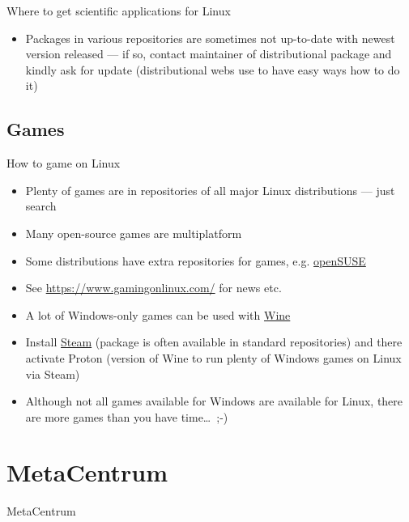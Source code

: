 \documentclass[compress, xelatex, 11pt, xcolor=svgnames, aspectratio=169,
	hyperref={
		bookmarks=true,
		unicode=true,
		colorlinks=true,
		pdftitle={Linux, command line and MetaCentrum},
		plainpages=false,
		pdfauthor={Vojtech Zeisek},
		pdfsubject={Course about use of Linux command line, writing shell scripts and using MetaCentrum of CESNET},
		pdfcreator={XeLaTeX},
		pdfkeywords={Linux, GNU, BASH, shell, command line, MetaCentrum},
		linkcolor=DarkRed, %
		anchorcolor=DarkBlue, %
		citecolor=Indigo, %
		filecolor=NavyBlue, %
		menucolor=DarkMagenta, %
		urlcolor=DarkBlue, %
		},
	url={hyphens, lowtilde} %
	]{beamer}
\begin{document}
\begin{frame}[allowframebreaks]{Where to get scientific applications for Linux}
\begin{itemize}
		\begin{itemize}
			\item Distributions sometimes provide packages at least for part of the packages of such languages --- typically at least for Python, Perl or R --- this is especially convenient for packages having plenty of complex dependencies
		\end{itemize}
		\item Packages in various repositories are sometimes not up-to-date with newest version released --- if so, contact maintainer of distributional package and kindly ask for update (distributional webs use to have easy ways how to do it)
	\end{itemize}
\end{frame}

\subsection{Games}

\begin{frame}{How to game on Linux}
	\begin{itemize}
		\item Plenty of games are in repositories of all major Linux distributions --- just search
		\item Many open-source games are multiplatform
		\item Some distributions have extra repositories for games, e.g. \href{https://software.opensuse.org/packages/Games}{openSUSE}
		\item See \url{https://www.gamingonlinux.com/} for news etc.
		\item A lot of Windows-only games can be used with \href{https://appdb.winehq.org/}{Wine}
		\item Install \href{https://store.steampowered.com/}{Steam} (package is often available in standard repositories) and there activate Proton (version of Wine to run plenty of Windows games on Linux via Steam)
		\item Although not all games available for Windows are available for Linux, there are more games than you have time\ldots~;-)
	\end{itemize}
\end{frame}

\section{MetaCentrum}

\begin{frame}{MetaCentrum}
	\tableofcontents[currentsection, sectionstyle=show/hide, hideothersubsections]
\end{frame}
\end{document}
